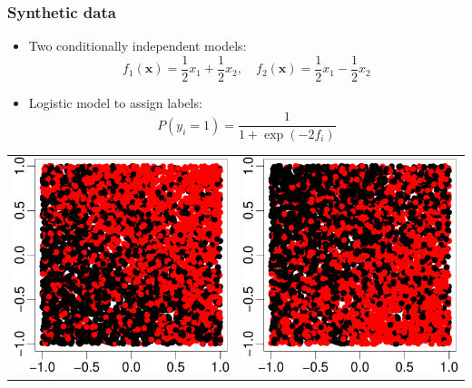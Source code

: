 \documentclass[]{beamer}
\renewcommand{\Pr}{P}
\newcommand{\bx}{\boldsymbol{x}}
\begin{document}
\begin{frame}
\frametitle{Synthetic data}

\begin{itemize}
\item Two conditionally independent models:
$$
f_1(\bx) = \frac{1}{2} x_1 + \frac{1}{2} x_2, \quad f_2(\bx) = \frac{1}{2} x_1 - \frac{1}{2} x_2 
$$
\item Logistic model to assign labels:
$$
\Pr(y_i = 1) = \frac{1}{1 + \exp(-2f_i)}
$$
\end{itemize}
\vskip12pt
\begin{center}
\begin{tabular}{@{}c@{$\quad\quad\quad$}c@{}}
\includegraphics[width = .35\textwidth]{pics/ind-1.pdf} &
\includegraphics[width = .35\textwidth]{pics/ind-2.pdf} \\
\end{tabular}
\end{center}

\end{frame}
\end{document}
